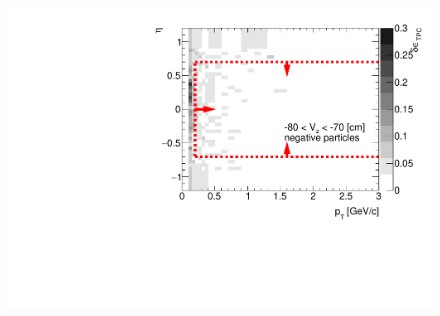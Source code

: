 \begin{figure}[H]
{		\includegraphics[width=\linewidth,page=15]{graphics/systematicsEfficiency/deadMaterial/secondaries_Unbinned_Charged_CD.pdf}\\
	}%
\end{figure}

